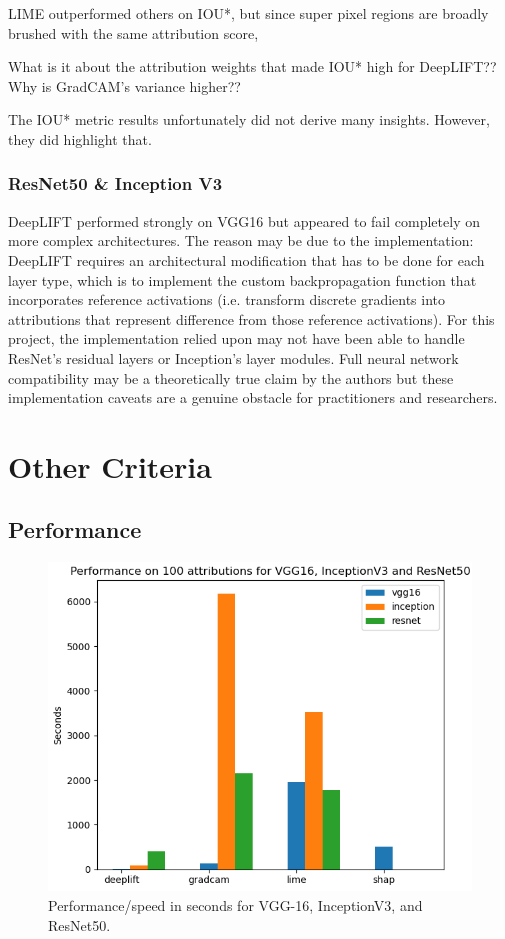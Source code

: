 \documentclass[main]{subfiles}
\begin{document}
LIME outperformed others on IOU*, but since super pixel regions are broadly brushed with the same attribution score, 


What is it about the attribution weights that made IOU* high for DeepLIFT?? Why is GradCAM's variance higher??

The IOU* metric results unfortunately did not derive many insights. However, they did highlight that.


\subsubsection{ResNet50 \& Inception V3}

DeepLIFT performed strongly on VGG16 but appeared to fail completely on more complex architectures. The reason may be due to the implementation: DeepLIFT requires an architectural modification that has to be done for each layer type, which is to implement the custom backpropagation function that incorporates reference activations (i.e. transform discrete gradients into attributions that represent difference from those reference activations). For this project, the implementation relied upon may not have been able to handle ResNet's residual layers or Inception's layer modules. Full neural network compatibility may be a theoretically true claim by the authors but these implementation caveats are a genuine obstacle for practitioners and researchers.



\newpage
\section{Other Criteria}
\subsection{Performance} \label{sec:perform}


\begin{figure}[h]\centering
\vfill
\includegraphics[scale=0.6]{performance.png}
\caption{Performance/speed in seconds for VGG-16, InceptionV3, and ResNet50. }
\label{performFig}
\vfill
\end{figure}
\end{document}
